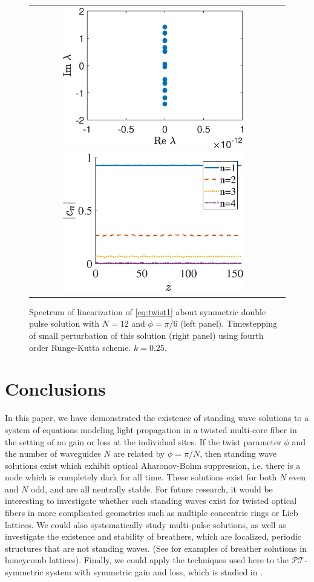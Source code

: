 \documentclass[12pt,reqno]{amsart}
\begin{document}
\begin{figure}[H]
\begin{center}
\begin{tabular}{cc}
\includegraphics[width=8cm]{dp12pi6spec.eps}
\includegraphics[width=8cm]{dp12pi6pert.eps}
\end{tabular}
\end{center}
\caption{Spectrum of linearization of \cref{eq:twist1} about symmetric double pulse solution with $N=12$ and $\phi = \pi/6$ (left panel). Timestepping of small perturbation of this solution (right panel) using fourth order Runge-Kutta scheme. $k=0.25$.}
\label{fig:dpstab}
\end{figure}

\section{Conclusions}

In this paper, we have demonstrated the existence of standing wave solutions to a system of equations modeling light propagation in a twisted multi-core fiber in the setting of no gain or loss at the individual sites. If the twist parameter $\phi$ and the number of waveguides $N$ are related by $\phi = \pi/N$, then standing wave solutions exist which exhibit optical Aharonov-Bohm suppression, i.e. there is a node which is completely dark for all time. These solutions exist for both $N$ even and $N$ odd, and are all neutrally stable. For future research, it would be interesting to investigate whether such standing waves exist for twisted optical fibers in more complicated geometries such as multiple concentric rings or Lieb lattices. We could also systematically study multi-pulse solutions, as well as investigate the existence and stability of breathers, which are localized, periodic structures that are not standing waves. (See \cite{Lumer2013} for examples of breather solutions in honeycomb lattices). Finally, we could apply the techniques used here to the $\mathcal{PT}$-symmetric system with symmetric gain and loss, which is studied in \cite{castro2016}.
\end{document}
